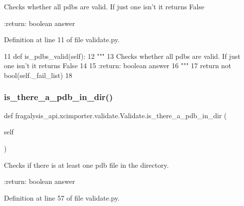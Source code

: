 \begin{DoxyVerb}Checks whether all pdbs are valid. If just one isn't it returns False

:return: boolean answer
\end{DoxyVerb}
 

Definition at line 11 of file validate.\+py.


\begin{DoxyCode}
11     \textcolor{keyword}{def }is\_pdbs\_valid(self):
12         \textcolor{stringliteral}{"""}
13 \textcolor{stringliteral}{        Checks whether all pdbs are valid. If just one isn't it returns False}
14 \textcolor{stringliteral}{}
15 \textcolor{stringliteral}{        :return: boolean answer}
16 \textcolor{stringliteral}{        """}
17         \textcolor{keywordflow}{return} \textcolor{keywordflow}{not} bool(self.\_fail\_list)
18 
\end{DoxyCode}
\mbox{\label{classfragalysis__api_1_1xcimporter_1_1validate_1_1_validate_a7203bedad575f779345a78f7880a58a2}} 
\subsubsection{\texorpdfstring{is\+\_\+there\+\_\+a\+\_\+pdb\+\_\+in\+\_\+dir()}{is\_there\_a\_pdb\_in\_dir()}}
{\footnotesize\ttfamily def fragalysis\+\_\+api.\+xcimporter.\+validate.\+Validate.\+is\+\_\+there\+\_\+a\+\_\+pdb\+\_\+in\+\_\+dir (\begin{DoxyParamCaption}\item[{}]{self }\end{DoxyParamCaption})}

\begin{DoxyVerb}Checks if there is at least one pdb file in the directory.

:return: boolean answer
\end{DoxyVerb}
 

Definition at line 57 of file validate.\+py.


